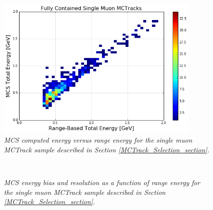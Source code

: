 \begin{figure}[h!]
\begin{center}
\includegraphics[width=100mm]{Figures/MCS_range_comparison_MCTracks.png}
\end{center}
\caption{\textit{MCS computed energy versus range energy for the single muon {\sc MCTrack} sample described in Section \ref{MCTrack_Selection_section}.}}
\label{MCS_range_energy_MCTrack_fig}
\end{figure}

\begin{figure}
\centering
\mbox{
	\quad
	}
\caption{\textit{MCS energy bias and resolution as a function of range energy for the single muon {\sc MCTrack} sample described in Section \ref{MCTrack_Selection_section}.}}
\label{MCS_range_bias_resolution_MCTrack_fig}
\end{figure}



